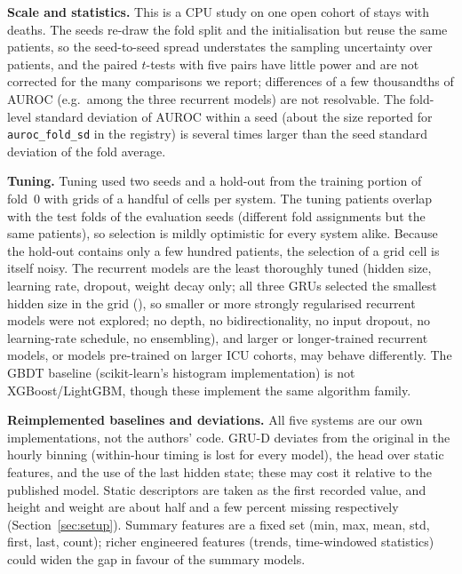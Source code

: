 \textbf{Scale and statistics.} This is a CPU study on one open cohort of  stays with  deaths. The  seeds re-draw the fold split and the initialisation but reuse the same patients, so the seed-to-seed spread understates the sampling uncertainty over patients, and the paired $t$-tests with five pairs have little power and are not corrected for the many comparisons we report; differences of a few thousandths of AUROC (e.g.\ among the three recurrent models) are not resolvable. The fold-level standard deviation of AUROC within a seed (about the size reported for \texttt{auroc\_fold\_sd} in the registry) is several times larger than the seed standard deviation of the fold average.

\textbf{Tuning.} Tuning used two seeds and a hold-out from the training portion of fold~0 with grids of a handful of cells per system. The tuning patients overlap with the test folds of the evaluation seeds (different fold assignments but the same  patients), so selection is mildly optimistic for every system alike. Because the hold-out contains only a few hundred patients, the selection of a grid cell is itself noisy. The recurrent models are the least thoroughly tuned (hidden size, learning rate, dropout, weight decay only; all three GRUs selected the smallest hidden size in the grid (), so smaller or more strongly regularised recurrent models were not explored; no depth, no bidirectionality, no input dropout, no learning-rate schedule, no ensembling), and larger or longer-trained recurrent models, or models pre-trained on larger ICU cohorts, may behave differently. The GBDT baseline (scikit-learn's histogram implementation) is not XGBoost/LightGBM, though these implement the same algorithm family.

\textbf{Reimplemented baselines and deviations.} All five systems are our own implementations, not the authors' code. GRU-D deviates from the original in the hourly binning (within-hour timing is lost for every model), the head over static features, and the use of the last hidden state; these may cost it relative to the published model. Static descriptors are taken as the first recorded value, and height and weight are about half and a few percent missing respectively (Section~\ref{sec:setup}). Summary features are a fixed set (min, max, mean, std, first, last, count); richer engineered features (trends, time-windowed statistics) could widen the gap in favour of the summary models.

